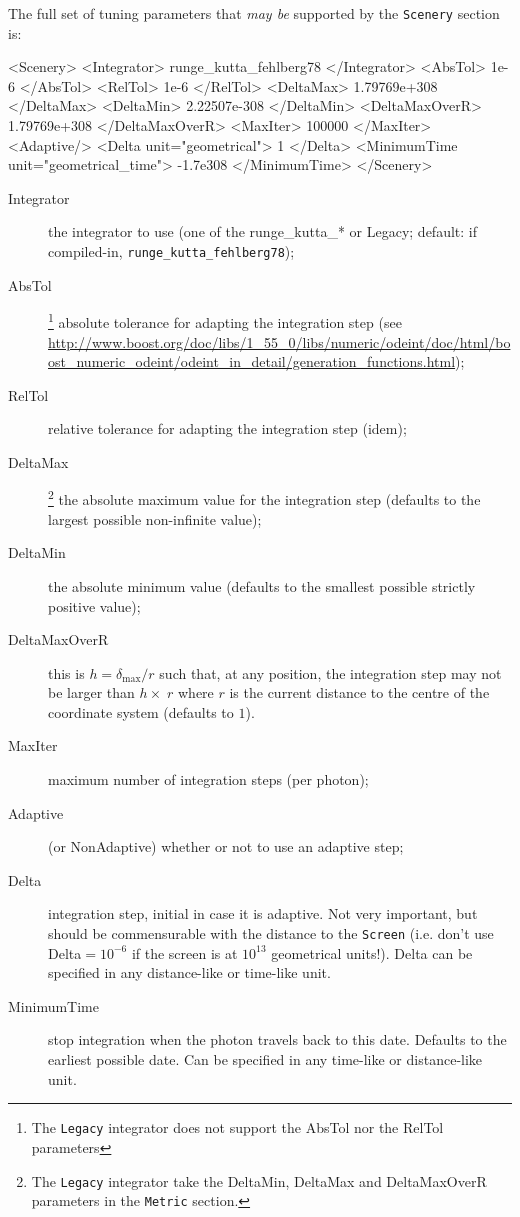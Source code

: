 \documentclass[a4paper,12pt]{article}
\begin{document}
The full set of tuning parameters that \emph{may be} supported by the
\texttt{Scenery} section is:
\begin{code}
<Scenery>
  <Integrator> runge_kutta_fehlberg78 </Integrator>
  <AbsTol> 1e-6 </AbsTol>
  <RelTol> 1e-6 </RelTol>
  <DeltaMax> 1.79769e+308 </DeltaMax>
  <DeltaMin> 2.22507e-308 </DeltaMin>
  <DeltaMaxOverR> 1.79769e+308 </DeltaMaxOverR>
  <MaxIter> 100000 </MaxIter>
  <Adaptive/>
  <Delta unit="geometrical"> 1 </Delta>
  <MinimumTime unit="geometrical_time"> -1.7e308 </MinimumTime>
</Scenery>
\end{code}

\begin{description}
\item[Integrator] the integrator to use (one of the runge\_kutta\_* or
  Legacy; default: if compiled-in, \texttt{runge\_kutta\_fehlberg78});
\item[AbsTol]\footnote{\label{note:abstol}The \texttt{Legacy}
    integrator does not support the AbsTol nor the RelTol parameters}
  absolute tolerance for adapting the integration step (see
  \url{http://www.boost.org/doc/libs/1_55_0/libs/numeric/odeint/doc/html/boost_numeric_odeint/odeint_in_detail/generation_functions.html});
\item[RelTol]\footnotemark[\value{footnote}] relative tolerance for
  adapting the integration step (idem);
\item[DeltaMax]\footnote{The \texttt{Legacy} integrator take the
    DeltaMin, DeltaMax and DeltaMaxOverR parameters in the
    \texttt{Metric} section.} the absolute maximum value for the
  integration step (defaults to the largest possible non-infinite
  value);
\item[DeltaMin]\footnotemark[\value{footnote}] the absolute minimum value (defaults to the smallest
  possible strictly positive value);
\item[DeltaMaxOverR]\footnotemark[\value{footnote}] this is $h=\delta_\text{max}/r$ such that, at any
  position, the integration step may not be larger than $h\times\;r$
  where $r$ is the current distance to the centre of the coordinate
  system (defaults to $1$).
\item[MaxIter] maximum number of integration steps (per photon);
\item[Adaptive] (or NonAdaptive) whether or not to use an adaptive step;
\item[Delta] integration step, initial in case it is adaptive. Not
  very important, but should be commensurable with the distance to the
  \texttt{Screen} (i.e. don't use Delta$=10^{-6}$ if the screen is at
  $10^{13}$ geometrical units!). Delta can be specified in any
  distance-like or time-like unit.
\item[MinimumTime] stop integration when the photon travels back to
  this date. Defaults to the earliest possible date. Can be specified
  in any time-like or distance-like unit.
\end{description}
\end{document}
